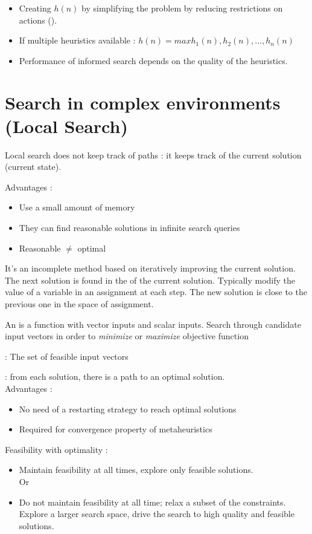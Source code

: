 \begin{itemize}
\item Creating $h(n)$ by simplifying the problem by reducing restrictions on actions ().
\item If multiple heuristics available : $h(n) = max{h_1(n), h_2(n), ..., h_n(n)}$
\item Performance of informed search depends on the quality of the heuristics.
\end{itemize}

\section{Search in complex environments (Local Search)}

Local search does not keep track of paths : it keeps track of the current solution (current state).

Advantages :
\begin{itemize}
\item Use a small amount of memory
\item They can find reasonable solutions in infinite search queries
\item Reasonable $\neq$ optimal
\end{itemize}

It's an incomplete method based on iteratively improving the current solution. The next solution is found in the  of the current solution. Typically modify the value of a variable in an assignment at each step. The new solution is close to the previous one in the space of assignment.

An  is a function with vector inputs and scalar inputs. Search through candidate input vectors in order to \textit{minimize} or \textit{maximize} objective function

 : The set of feasible input vectors

 : from each solution, there is a path to an optimal solution.\\
Advantages :
\begin{itemize}
\item No need of a restarting strategy to reach optimal solutions
\item Required for convergence property of metaheuristics
\end{itemize}

Feasibility with optimality :
\begin{itemize}
\item Maintain feasibility at all times, explore only feasible solutions.\\
Or
\item Do not maintain feasibility at all time; relax a subset of the constraints. Explore a larger search space, drive the search to high quality and feasible solutions.
\end{itemize}

